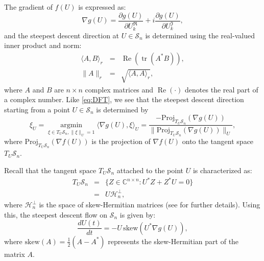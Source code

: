 \documentclass[onefignum,onetabnum]{siamart220329}
\begin{document}
    The gradient of $f(U)$ is expressed as:
    \[
    \nabla g(U) = \frac{\partial g(U)}{\partial U_k^\mathfrak{R}} + i \frac{\partial g(U)}{\partial U_k^\mathfrak{I}},
    \]
    and the steepest descent direction at $U \in \mathcal{S}_n$ is determined using the real-valued inner product and norm:
    \begin{eqnarray}\label{eq:inner}
    \langle A, B \rangle_{r} &=& \operatorname{Re}(\operatorname{tr}(A^* B)),\\
    \| A \|_{r} &=& \sqrt{\langle A, A \rangle_{r}},
    \end{eqnarray}
    where $A$ and $B$ are $n \times n$ complex matrices and $\operatorname{Re}(\cdot)$ denotes the real part of a complex number.
    Like \eqref{eq:DFT}, we see that the steepest descent direction 
     starting from a point  $U\in\mathcal{S}_n$ is determined by
    \begin{equation}\label{eq:steep}
    \xi_U = \underset{\xi \in T_U\mathcal{S}_n, \|\xi\|_U = 1}{\operatorname{argmin}} \langle \nabla g(U), \xi \rangle_U 
    = \frac{-\mathrm{Proj}_{T_U\mathcal{S}_n} (\nabla g(U))}{\|\mathrm{Proj}_{T_U\mathcal{S}_n} (\nabla g(U))\|_U},
    \end{equation}
    where $\mathrm{Proj}_{T_U\mathcal{S}_n} (\nabla f(U))$ is the projection of $\nabla f(U)$ onto the tangent space $T_U\mathcal{S}_n$.
    
    
    
    
    
    Recall that the tangent space $T_U \mathcal{S}_n$ attached to the point $U$ is characterized as:
    \begin{eqnarray}\label{eq:tangent}
    T_U \mathcal{S}_n &=& \{Z \in \mathbb{C}^{n \times n} : U^* Z + Z^* U = 0 \} \nonumber \\
    &=& U \mathcal{H}_n^\perp, \nonumber
    \end{eqnarray}
    where $\mathcal{H}_n^\perp$ is the space of skew-Hermitian matrices (see \cite{Edelman1998} for further details). Using this, the steepest descent flow on $\mathcal{S}_n$ is given by:
    \begin{equation}\label{eq:sdf}
    \frac{dU(t)}{dt} = -U \, \mathrm{skew}(U^* \nabla g(U)),
    \end{equation}
    where $\mathrm{skew}(A) = \frac{1}{2}(A - A^*)$ represents the skew-Hermitian part of the matrix $A$.
    
\end{document}
